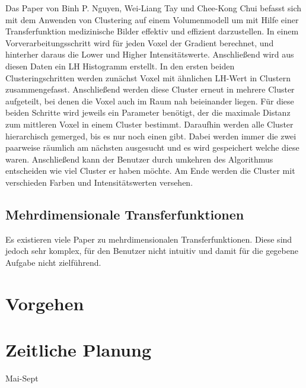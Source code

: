 \documentclass{article}
\begin{document}
Das Paper von Binh P. Nguyen, Wei-Liang Tay und Chee-Kong Chui \cite{nguyen2012clustering} befasst sich mit dem Anwenden von Clustering auf einem Volumenmodell um mit Hilfe einer Transferfunktion medizinische Bilder effektiv und effizient darzustellen.
\newline
In einem Vorverarbeitungsschritt wird für jeden Voxel der Gradient berechnet, und hinterher daraus die Lower und Higher Intensitätswerte. Anschließend wird aus diesen Daten ein LH Histogramm erstellt.
\newline
In den ersten beiden Clusteringschritten werden zunächst Voxel mit ähnlichen  LH-Wert in Clustern zusammengefasst. Anschließend werden diese Cluster erneut in mehrere Cluster aufgeteilt, bei denen die Voxel auch im Raum nah beieinander liegen. Für diese beiden Schritte wird jeweils ein Parameter benötigt, der die maximale Distanz zum mittleren Voxel in einem Cluster bestimmt. Daraufhin werden alle Cluster hierarchisch gemerged, bis es nur noch einen gibt. Dabei werden immer die zwei paarweise räumlich am nächsten ausgesucht und es wird gespeichert welche diese waren. Anschließend kann der Benutzer durch umkehren des Algorithmus entscheiden wie viel Cluster er haben möchte. Am Ende werden die Cluster mit verschieden Farben und Intensitätswerten versehen.



\subsection{Mehrdimensionale Transferfunktionen}

Es existieren viele Paper zu mehrdimensionalen Transferfunktionen. Diese sind jedoch sehr komplex, für den Benutzer nicht intuitiv und damit für die gegebene Aufgabe nicht zielführend.


\section{Vorgehen}

\section{Zeitliche Planung}
Mai-Sept

{}

\nocite{*}
\end{document}
